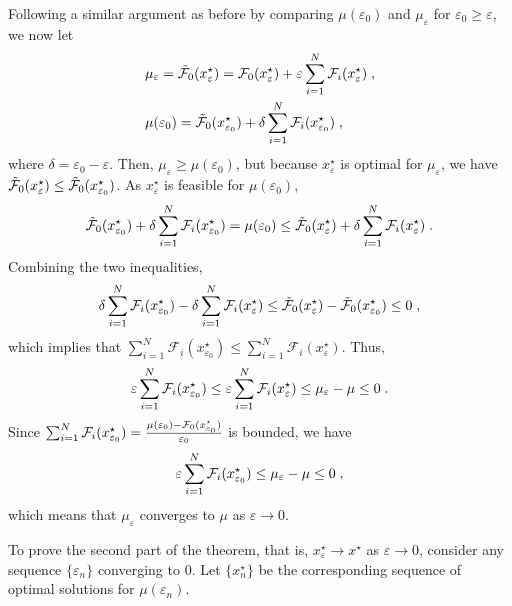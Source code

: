 \documentclass[journal,twoside,web]{ieeecolor}
\begin{document}
Following a similar argument as before by comparing $\mu(\varepsilon_0)$ and $\mu_\varepsilon$ for $\varepsilon_0\geq \varepsilon$, we now let
\begin{align*}
&\mu_\varepsilon=\tilde{{\cal F}}_0(x^\star_\varepsilon)=\mathcal{F}_0(x^\star_\varepsilon)+\varepsilon\sum_{i=1}^N\mathcal{F}_i(x^\star_\varepsilon)\;,\\
&\mu(\varepsilon_0)=\tilde{{\cal F}}_0(x^\star_{\varepsilon_0})+\delta\sum_{i=1}^N\mathcal{F}_i(x^\star_{\varepsilon_0})\;,
\end{align*}
where $\delta=\varepsilon_0-\varepsilon$. Then, $\mu_\varepsilon\geq \mu(\varepsilon_0)$\;,
but because $x_\varepsilon^\star$ is optimal for $\mu_\varepsilon$\;, we have
$\tilde{{\cal F}}_0(x^\star_\varepsilon)\leq \tilde{{\cal F}}_0(x^\star_{\varepsilon_0})$.
As $x^\star_\varepsilon$ is feasible for $\mu(\varepsilon_0)$, \begin{align*}
\tilde{{\cal F}}_0(x^\star_{\varepsilon_0})+\delta\sum_{i=1}^N\mathcal{F}_i(x^\star_{\varepsilon_0})=\mu(\varepsilon_0)\leq \tilde{{\cal F}}_0(x^\star_{\varepsilon})+\delta\sum_{i=1}^N\mathcal{F}_i(x^\star_{\varepsilon})\;.
\end{align*}
Combining the two inequalities,
\begin{align*}
\delta\sum_{i=1}^N\mathcal{F}_i(x^\star_{\varepsilon_0})-\delta\sum_{i=1}^N\mathcal{F}_i(x^\star_{\varepsilon})\leq \tilde{{\cal F}}_0(x^\star_{\varepsilon})-\tilde{{\cal F}}_0(x^\star_{\varepsilon_0})\leq 0\;,
\end{align*}
which implies that $\sum_{i=1}^N\mathcal{F}_i(x^\star_{\varepsilon_0})\leq \sum_{i=1}^N\mathcal{F}_i(x^\star_{\varepsilon})$. Thus,
\begin{equation}\label{limi.eq}
\varepsilon\sum_{i=1}^N{\cal F}_{i}(x_{\varepsilon_0}^\star)\leq
\varepsilon\sum_{i=1}^N{\cal F}_{i}(x_{\varepsilon}^\star)\leq
\mu_\varepsilon-\mu \leq 0\;.
\end{equation}
Since $\sum_{i=1}^N{\cal F}_{i}(x_{\varepsilon_0}^\star)=\frac{\mu(\varepsilon_0)-\mathcal{F}_0(x^\star_{\varepsilon_0})}{\varepsilon_0}$ is bounded, we have
\begin{equation}\label{limi2.eq}
\varepsilon\sum_{i=1}^N{\cal F}_{i}(x_{\varepsilon_0}^\star)\leq
\mu_\varepsilon-\mu\leq 0\;,
\end{equation}
which means that $\mu_\varepsilon$ converges to $\mu$ as $\varepsilon\to 0$.

To prove the second part of the theorem, that is, $x^\star_\varepsilon \to x^\star$ as $\varepsilon \to 0$, consider any sequence $\{\varepsilon_n\}$ converging to $0$. Let $\{x^\star_{n}\}$ be the corresponding sequence of optimal solutions for $\mu(\varepsilon_n)$.
\end{document}
